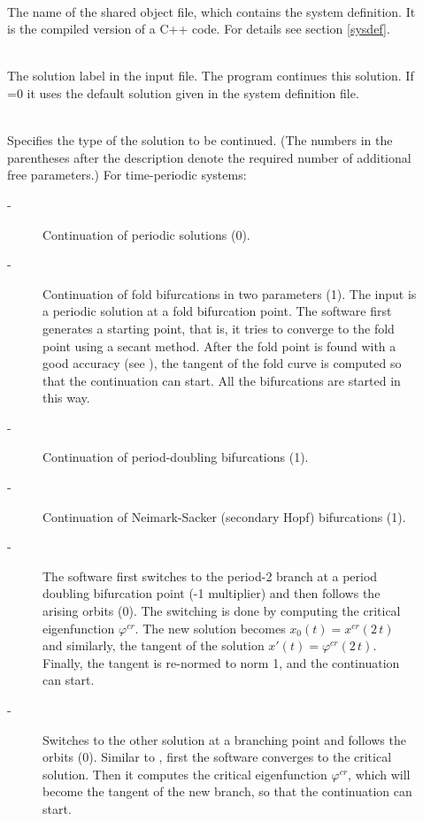 \documentclass[10pt,a4paper]{ddedoc}
\begin{document}
\begin{description}
\item[] ~\\
The name of the shared object file,
which contains the system definition. It is the compiled version of a C++
code. For details see section \ref{sysdef}.
%
\item[] ~\\
The solution label in the input file. The program continues this
solution. If =0 it uses the default solution given in the system
definition file.
%
\item[] ~\\
Specifies the type of the solution to be continued. (The numbers in the parentheses after the description denote the required number of additional free parameters.) For time-periodic systems:
\begin{description}
\item[ -] Continuation of periodic solutions (0).
%
\item[ -] Continuation of fold bifurcations in two parameters (1). The input is a periodic solution at a fold bifurcation point. The software first generates a starting point, that is, it tries to converge to the fold point using a secant method. After the fold point is found with a good accuracy (see ), the tangent of the fold curve is computed so that the continuation can start. All the bifurcations are started in this way.
%
\item[ -] Continuation of period-doubling bifurcations (1).
%
\item[ -] Continuation of Neimark-Sacker (secondary Hopf) bifurcations (1).
%
\item[ -] The software first switches to the period-2 branch at a period doubling bifurcation point
(-1 multiplier) and then follows the arising orbits (0). The switching is done by computing the critical eigenfunction $\varphi^{cr}$. The new solution becomes $x_0(t) = x^{cr}(2\,t)$ and similarly, the tangent of the solution $x'(t) = \varphi^{cr}(2\,t)$. Finally, the tangent is re-normed to norm 1, and the continuation can start.
%
\item[ -] Switches to the other solution at a branching point and follows the orbits (0). Similar to , first the software converges to the critical solution. Then it computes the critical eigenfunction $\varphi^{cr}$, which will become the tangent of the new branch, so that the continuation can start.

\end{description}
\end{description}
\end{document}
